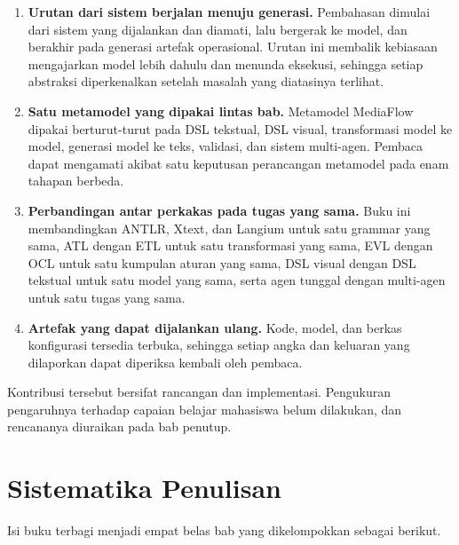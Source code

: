 \begin{enumerate}
  \item \textbf{Urutan dari sistem berjalan menuju generasi.} Pembahasan dimulai
        dari sistem yang dijalankan dan diamati, lalu bergerak ke model, dan
        berakhir pada generasi artefak operasional. Urutan ini membalik
        kebiasaan mengajarkan model lebih dahulu dan menunda eksekusi, sehingga
        setiap abstraksi diperkenalkan setelah masalah yang diatasinya terlihat.
  \item \textbf{Satu metamodel yang dipakai lintas bab.} Metamodel MediaFlow
        dipakai berturut-turut pada DSL tekstual, DSL visual, transformasi model
        ke model, generasi model ke teks, validasi, dan sistem multi-agen.
        Pembaca dapat mengamati akibat satu keputusan perancangan metamodel pada
        enam tahapan berbeda.
  \item \textbf{Perbandingan antar perkakas pada tugas yang sama.} Buku ini
        membandingkan ANTLR, Xtext, dan Langium untuk satu grammar yang sama,
        ATL dengan ETL untuk satu transformasi yang sama, EVL dengan OCL untuk
        satu kumpulan aturan yang sama, DSL visual dengan DSL tekstual untuk satu
        model yang sama, serta agen tunggal dengan multi-agen untuk satu tugas
        yang sama.
  \item \textbf{Artefak yang dapat dijalankan ulang.} Kode, model, dan berkas
        konfigurasi tersedia terbuka, sehingga setiap angka dan keluaran yang
        dilaporkan dapat diperiksa kembali oleh pembaca.
\end{enumerate}

Kontribusi tersebut bersifat rancangan dan implementasi. Pengukuran pengaruhnya
terhadap capaian belajar mahasiswa belum dilakukan, dan rencananya diuraikan
pada bab penutup.

\section*{Sistematika Penulisan}

Isi buku terbagi menjadi empat belas bab yang dikelompokkan sebagai berikut.

